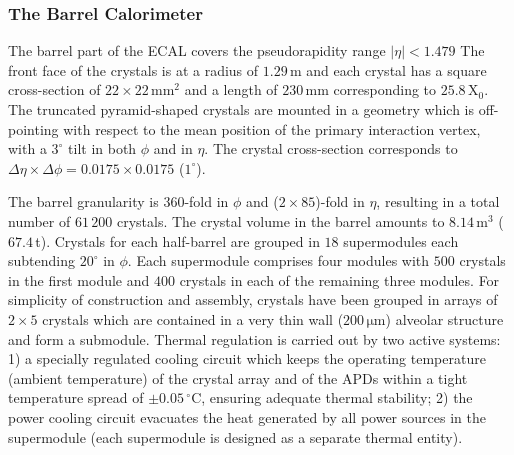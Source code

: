 \subsubsection{The Barrel Calorimeter}
The barrel part of the ECAL covers the pseudorapidity range $|\eta| < 1.479$ 
The front face of the crystals is at a radius of $1.29 \,$m and each crystal has a square cross-section of $ 22 \times 22 \,$mm$^2$ and a length of $230 \,$mm corresponding to $25.8 \,$X$_0$. The truncated pyramid-shaped crystals are mounted in a geometry which is off-pointing with respect to the mean position of the primary interaction vertex, with a $3^{\circ}$ tilt in both $\phi$ and in $\eta$. The crystal cross-section corresponds to $\Delta \eta \times \Delta \phi = 0.0175 \times 0.0175$ ($1^{\circ}$). 

The barrel granularity is $360$-fold in $\phi$ and ($2 \times 85$)-fold in $\eta$, resulting in a total number of $61\,200$ crystals. The crystal volume in the barrel amounts to $8.14 \,$m$^3$ ($67.4 \,$t). Crystals for each half-barrel are grouped in $18$ supermodules each subtending $20^{\circ}$ in $\phi$. Each supermodule comprises four modules with $500$ crystals in the first module and $400$ crystals in each of the remaining three modules. For simplicity of construction and assembly, crystals have been grouped in arrays of $2 \times 5$ crystals which are contained in a very thin wall ($200 \,\mathrm{\mu m}$) alveolar structure and form a submodule.  Thermal regulation is carried out by two active systems: 1) a specially regulated cooling circuit which keeps the operating temperature (ambient temperature) of the crystal array and of the APDs within a tight temperature spread of $\pm0.05 \, ^{\circ}$C, ensuring adequate thermal stability; 2) the power cooling circuit evacuates the heat generated by all power sources in the supermodule (each supermodule is designed as a separate thermal entity).

